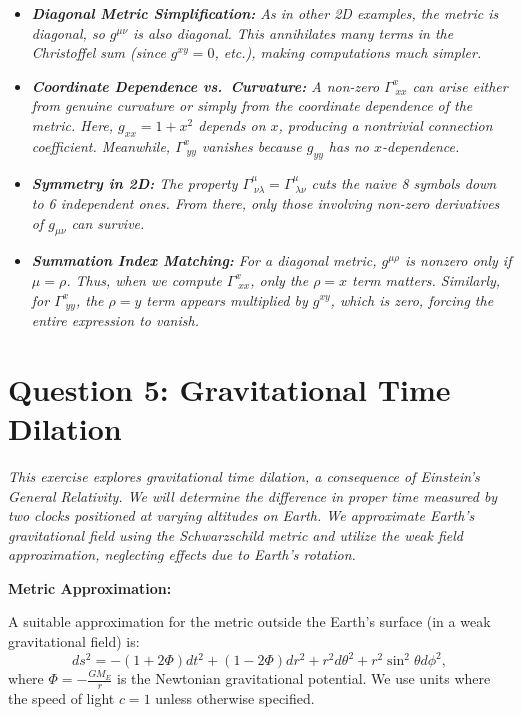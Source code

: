 \begin{itemize}
    \item \emph{\textbf{Diagonal Metric Simplification:} As in other 2D examples, the metric is diagonal, so \(g^{\mu\nu}\) is also diagonal. This annihilates many terms in the Christoffel sum (since \(g^{xy} = 0\), etc.), making computations much simpler.}

    \item \emph{\textbf{Coordinate Dependence vs.\ Curvature:} A non-zero \(\Gamma^x_{\;xx}\) can arise either from genuine curvature or simply from the coordinate dependence of the metric. Here, \(g_{xx} = 1 + x^2\) depends on \(x\), producing a nontrivial connection coefficient. Meanwhile, \(\Gamma^x_{\;yy}\) vanishes because \(g_{yy}\) has no \(x\)-dependence.}

    \item \emph{\textbf{Symmetry in 2D:} The property \(\Gamma^\mu_{\;\nu\lambda} = \Gamma^\mu_{\;\lambda\nu}\) cuts the naive 8 symbols down to 6 independent ones. From there, only those involving non-zero derivatives of \(g_{\mu\nu}\) can survive.}

    \item \emph{\textbf{Summation Index Matching:} For a diagonal metric, \(g^{\mu\rho}\) is nonzero only if \(\mu = \rho\). Thus, when we compute \(\Gamma^x_{\;xx}\), only the \(\rho = x\) term matters. Similarly, for \(\Gamma^x_{\;yy}\), the \(\rho = y\) term appears multiplied by \(g^{xy}\), which is zero, forcing the entire expression to vanish.}
\end{itemize}

\pagebreak

\section*{Question 5: Gravitational Time Dilation}

\textit{This exercise explores gravitational time dilation, a consequence of Einstein's General Relativity. We will determine the difference in proper time measured by two clocks positioned at varying altitudes on Earth. We approximate Earth's gravitational field using the Schwarzschild metric and utilize the weak field approximation, neglecting effects due to Earth's rotation.}

\textbf{Metric Approximation:}

A suitable approximation for the metric outside the Earth's surface (in a weak gravitational field) is:
\[
ds^2 = -\left(1+2\Phi\right)dt^2 + \left(1-2\Phi\right)dr^2 + r^2d\theta^2 + r^2\sin^2\theta d\phi^2,
\]
where $\Phi = -\frac{GM_E}{r}$ is the Newtonian gravitational potential. We use units where the speed of light $c=1$ unless otherwise specified.

